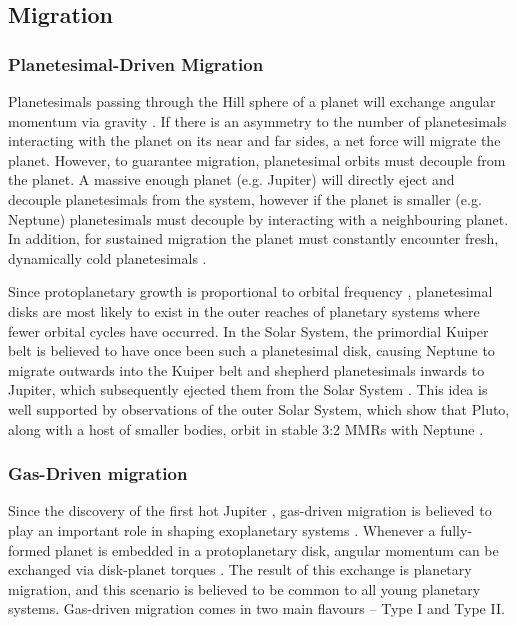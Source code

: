 \subsection{Migration}
\label{sec:migration}

\subsubsection{Planetesimal-Driven Migration}
Planetesimals passing through the Hill sphere of a planet will exchange angular momentum via gravity \citep{Ida2000, Kirsh2009}.
If there is an asymmetry to the number of planetesimals interacting with the planet on its near and far sides, a net force will migrate the planet. 
However, to guarantee migration, planetesimal orbits must decouple from the planet. 
A massive enough planet (e.g. Jupiter) will directly eject and decouple planetesimals from the system, however if the planet is smaller (e.g. Neptune) planetesimals must decouple by interacting with a neighbouring planet. 
In addition, for sustained migration the planet must constantly encounter fresh, dynamically cold planetesimals \citep{Gomes2004}.  

Since protoplanetary growth is proportional to orbital frequency \citep{Rafikov2003}, planetesimal disks are most likely to exist in the outer reaches of planetary systems where fewer orbital cycles have occurred. 
In the Solar System, the primordial Kuiper belt is believed to have once been such a planetesimal disk, causing Neptune to migrate outwards into the Kuiper belt and shepherd planetesimals inwards to Jupiter, which subsequently ejected them from the Solar System \citep{Fernandez1984}.
This idea is well supported by observations of the outer Solar System, which show that Pluto, along with a host of smaller bodies, orbit in stable 3:2 MMRs with Neptune \citep{Malhotra1993, Malhotra1995}.

\subsubsection{Gas-Driven migration}
Since the discovery of the first hot Jupiter \citep{Mayor1995}, gas-driven migration is believed to play an important role in shaping exoplanetary systems \citep{Lin1996}.
Whenever a fully-formed planet is embedded in a protoplanetary disk, angular momentum can be exchanged via disk-planet torques \citep{Goldreich1980}.
The result of this exchange is planetary migration, and this scenario is believed to be common to all young planetary systems. 
Gas-driven migration comes in two main flavours -- Type I and Type II. 

